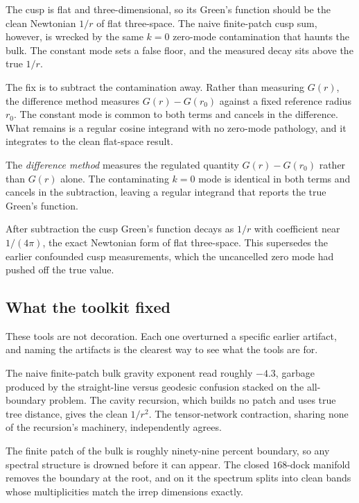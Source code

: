The cusp is flat and three-dimensional, so its Green's function should be the clean Newtonian $1/r$ of flat three-space. The naive finite-patch cusp sum, however, is wrecked by the same $k=0$ zero-mode contamination that haunts the bulk. The constant mode sets a false floor, and the measured decay sits above the true $1/r$.

The fix is to subtract the contamination away. Rather than measuring $G(r)$, the difference method measures $G(r) - G(r_0)$ against a fixed reference radius $r_0$. The constant mode is common to both terms and cancels in the difference. What remains is a regular cosine integrand with no zero-mode pathology, and it integrates to the clean flat-space result.

\begin{definition}
The \emph{difference method} measures the regulated quantity $G(r) - G(r_0)$ rather than $G(r)$ alone. The contaminating $k=0$ mode is identical in both terms and cancels in the subtraction, leaving a regular integrand that reports the true Green's function.
\end{definition}

\begin{result}
After subtraction the cusp Green's function decays as $1/r$ with coefficient near $1/(4\pi)$, the exact Newtonian form of flat three-space. This supersedes the earlier confounded cusp measurements, which the uncancelled zero mode had pushed off the true value.
\end{result}

\subsection{What the toolkit fixed}

These tools are not decoration. Each one overturned a specific earlier artifact, and naming the artifacts is the clearest way to see what the tools are for.

The naive finite-patch bulk gravity exponent read roughly $-4.3$, garbage produced by the straight-line versus geodesic confusion stacked on the all-boundary problem. The cavity recursion, which builds no patch and uses true tree distance, gives the clean $1/r^2$. The tensor-network contraction, sharing none of the recursion's machinery, independently agrees.

The finite patch of the bulk is roughly ninety-nine percent boundary, so any spectral structure is drowned before it can appear. The closed $168$-dock manifold removes the boundary at the root, and on it the spectrum splits into clean bands whose multiplicities match the irrep dimensions exactly.

